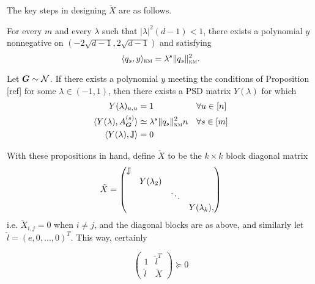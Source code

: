 The key steps in designing $\check X$ are as follows.
%
\begin{proposition}
    For every $m$ and every $\lambda$ such that $|\lambda|^2(d-1) < 1$, there exists a polynomial $y$ nonnegative on $(-2\sqrt{d-1},2\sqrt{d-1})$ and satisfying
    $$
        \langle q_s,y \rangle_{\textsc{km}} = \lambda^s\|q_s\|^2_{\textsc{km}}.
    $$
\end{proposition}
\begin{proposition}
    Let $\boldsymbol{G} \sim \mathcal{N}$. If there exists a polynomial $y$ meeting the conditions of Proposition [ref] for some $\lambda \in (-1,1)$, then there exists a PSD matrix $Y(\lambda)$ for which
    \begin{align*}
        Y(\lambda)_{u,u} &= 1 & & \forall u\in[n] \\
         \langle Y(\lambda), A^{(s)}_{\boldsymbol{G}} \rangle &\simeq \lambda^s \|q_s\|^2_{\textsc{km}}n & & \forall s \in[m] \\
         \langle Y(\lambda),\mathbb{J} \rangle &= 0
    \end{align*}
\end{proposition}

\noindent With these propositions in hand, define $\check X$ to be the $k\times k$ block diagonal matrix
$$
    \check X = \begin{pmatrix} 
        \mathbb{J} & & & \\
           &Y(\lambda_2)& & \\
           & &\ddots & \\
           & & & Y(\lambda_k),
    \end{pmatrix}
$$
i.e. $\check X_{i,j} = 0$ when $i\neq j$, and the diagonal blocks are as above, and similarly let $\check l = (e,0,...,0)^T$. This way, certainly 

\begin{equation}
    \begin{pmatrix} 1 & \check l^T \\ \check l & \check X \end{pmatrix} \succeq 0  
\end{equation}
 
